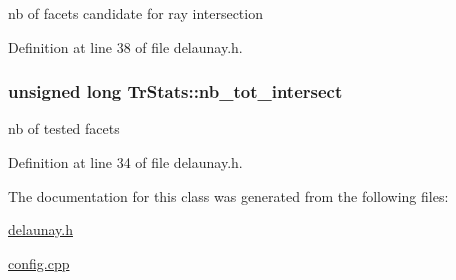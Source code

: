 nb of facets candidate for ray intersection 



Definition at line 38 of file delaunay.h.

\hypertarget{classTrStats_a3d4033d7f4886cfb82d941e21897acce}{
\subsubsection[{nb\_\-tot\_\-intersect}]{\setlength{\rightskip}{0pt plus 5cm}unsigned long {\bf TrStats::nb\_\-tot\_\-intersect}}}
\label{classTrStats_a3d4033d7f4886cfb82d941e21897acce}


nb of tested facets 



Definition at line 34 of file delaunay.h.



The documentation for this class was generated from the following files:\begin{DoxyCompactItemize}
\item 
\hyperlink{delaunay_8h}{delaunay.h}\item 
\hyperlink{config_8cpp}{config.cpp}\end{DoxyCompactItemize}
